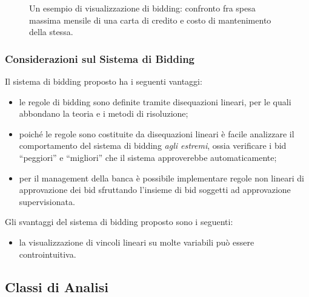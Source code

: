 \begin{figure}
\centering
	\caption{Un esempio di visualizzazione di bidding: confronto fra spesa massima mensile di una carta di credito e costo di mantenimento della stessa.}
	\label{fig:visualization-bidding}
\end{figure}

\subsubsection{Considerazioni sul Sistema di Bidding}

Il sistema di bidding proposto ha i seguenti vantaggi:
\begin{itemize}
	\item le regole di bidding sono definite tramite disequazioni lineari, per le quali abbondano la teoria e i metodi di risoluzione;

	\item poiché le regole sono costituite da disequazioni lineari è facile analizzare il comportamento del sistema di bidding \emph{agli estremi}, ossia verificare i bid ``peggiori'' e ``migliori'' che il sistema approverebbe automaticamente;

	\item per il management della banca è possibile implementare regole non lineari di approvazione dei bid sfruttando l'insieme di bid soggetti ad approvazione supervisionata.
\end{itemize}

Gli svantaggi del sistema di bidding proposto sono i seguenti:
\begin{itemize}
	\item la visualizzazione di vincoli lineari su molte variabili può essere controintuitiva.
\end{itemize}

\subsection{Classi di Analisi}



